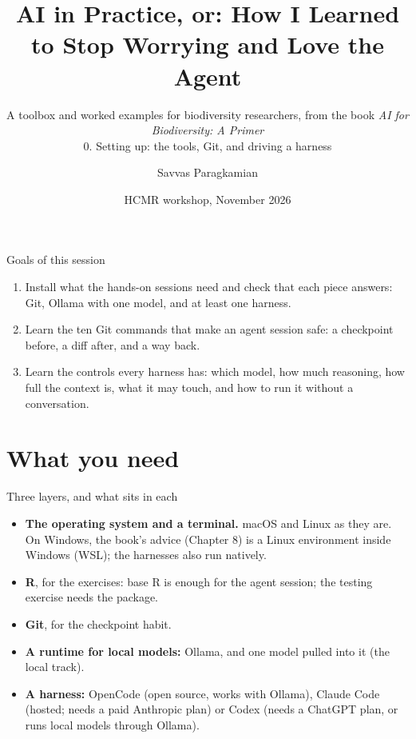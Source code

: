 \documentclass[11pt,aspectratio=169]{beamer}
\title[AI in Practice 0]{AI in Practice, or: How I Learned to Stop Worrying and Love the Agent}
\subtitle{A toolbox and worked examples for biodiversity researchers, from the book \emph{AI for Biodiversity: A Primer}\\[0.6em] 0. Setting up: the tools, Git, and driving a harness}
\author{Savvas Paragkamian}
\institute{Hellenic Centre for Marine Research \\ KYBELE and ELIXIR-GR}
\date{HCMR workshop, November 2026}
\begin{document}
\begin{frame}[plain]
  \titlepage
\end{frame}

\begin{frame}{Goals of this session}
  \begin{enumerate}
    \item Install what the hands-on sessions need and check that each piece
      answers: Git, Ollama with one model, and at least one harness.
    \item Learn the ten Git commands that make an agent session safe: a
      checkpoint before, a diff after, and a way back.
    \item Learn the controls every harness has: which model, how much
      reasoning, how full the context is, what it may touch, and how to run
      it without a conversation.
  \end{enumerate}
\end{frame}

\section{What you need}

\begin{frame}{Three layers, and what sits in each}
  \begin{itemize}
    \item \textbf{The operating system and a terminal.} macOS and Linux as
      they are. On Windows, the book's advice (Chapter 8) is a Linux
      environment inside Windows (WSL); the harnesses also run natively.
    \item \textbf{R}, for the exercises: base R is enough for the agent
      session; the testing exercise needs the  package.
    \item \textbf{Git}, for the checkpoint habit.
    \item \textbf{A runtime for local models:} Ollama, and one model pulled
      into it (the local track).
    \item \textbf{A harness:} OpenCode (open source, works with Ollama),
      Claude Code (hosted; needs a paid Anthropic plan) or Codex (needs a
      ChatGPT plan, or runs local models through Ollama).
  \end{itemize}
\end{frame}
\end{document}
